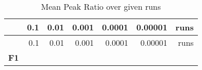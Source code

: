 \documentclass[12pt,a4paper]{article}
\begin{document}
\begin{longtable}[c]{@{}crrrrrr@{}}
\caption{Mean Peak Ratio over given runs}\tabularnewline
\toprule
\begin{minipage}[b]{0.11\columnwidth}\centering\strut
~
\strut\end{minipage} &
\begin{minipage}[b]{0.07\columnwidth}\raggedleft\strut
0.1
\strut\end{minipage} &
\begin{minipage}[b]{0.08\columnwidth}\raggedleft\strut
0.01
\strut\end{minipage} &
\begin{minipage}[b]{0.09\columnwidth}\raggedleft\strut
0.001
\strut\end{minipage} &
\begin{minipage}[b]{0.10\columnwidth}\raggedleft\strut
0.0001
\strut\end{minipage} &
\begin{minipage}[b]{0.11\columnwidth}\raggedleft\strut
0.00001
\strut\end{minipage} &
\begin{minipage}[b]{0.07\columnwidth}\raggedleft\strut
runs
\strut\end{minipage}\tabularnewline
\midrule
\endfirsthead
\toprule
\begin{minipage}[b]{0.11\columnwidth}\centering\strut
~
\strut\end{minipage} &
\begin{minipage}[b]{0.07\columnwidth}\raggedleft\strut
0.1
\strut\end{minipage} &
\begin{minipage}[b]{0.08\columnwidth}\raggedleft\strut
0.01
\strut\end{minipage} &
\begin{minipage}[b]{0.09\columnwidth}\raggedleft\strut
0.001
\strut\end{minipage} &
\begin{minipage}[b]{0.10\columnwidth}\raggedleft\strut
0.0001
\strut\end{minipage} &
\begin{minipage}[b]{0.11\columnwidth}\raggedleft\strut
0.00001
\strut\end{minipage} &
\begin{minipage}[b]{0.07\columnwidth}\raggedleft\strut
runs
\strut\end{minipage}\tabularnewline
\midrule
\endhead
\begin{minipage}[t]{0.11\columnwidth}\centering\strut
\textbf{F1}

\end{minipage}
\end{longtable}
\end{document}
